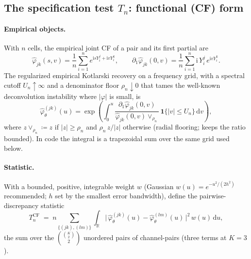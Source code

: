 \documentclass[11pt]{article}
\theoremstyle{definition}
\newcommand{\R}{\mathbb{R}}
\newcommand{\ecf}{\widehat{\varphi}}
\newcommand{\ii}{\mathrm{i}}          %
\newcommand{\Th}{\theta}
\newcommand{\lat}{\Th}
\begin{document}
\subsection{The specification test $T_n$: functional (CF) form}
\label{sec:testCF}

\paragraph{Empirical objects.} With $n$ cells, the empirical joint CF of a pair
and its first partial are
\[
  \ecf_{jk}(s,v)=\frac1n\sum_{i=1}^n e^{\ii s Y^j_i+\ii v Y^k_i},
  \qquad
  \partial_1\ecf_{jk}(0,v)=\frac1n\sum_{i=1}^n \ii\,Y^j_i\,e^{\ii v Y^k_i}.
\]
The regularized empirical Kotlarski recovery on a frequency grid, with a
spectral cutoff $U_n\uparrow\infty$ and a denominator floor $\rho_n\downarrow0$
that tames the well-known deconvolution instability where $|\varphi|$ is small,
is
\begin{equation}\label{eq:emp-kotlarski}
  \widehat{\varphi}_\lat^{(jk)}(u)
  =\exp\!\left(\int_0^{u}
  \frac{\partial_1\ecf_{jk}(0,v)}
       {\ecf_{jk}(0,v)\vee_{\rho_n}}\,
  \mathbf 1\{|v|\le U_n\}\,\mathrm dv\right),
\end{equation}
where $z\vee_{\rho_n}\coloneqq z$ if $|z|\ge\rho_n$ and
$\rho_n\,z/|z|$ otherwise (radial flooring; keeps the ratio bounded). In code
the integral is a trapezoidal sum over the same grid used below.

\paragraph{Statistic.} With a bounded, positive, integrable weight $w$
(Gaussian $w(u)=e^{-u^2/(2h^2)}$ recommended; $h$ set by the smallest error
bandwidth), define the pairwise-discrepancy statistic
\begin{equation}\label{eq:Tn-CF}
  T_n^{\mathrm{CF}}
  \;=\; n \!\!\sum_{\{(jk),(lm)\}}\!\!
  \int_{\R}\big|\,\widehat{\varphi}_\lat^{(jk)}(u)
                 -\widehat{\varphi}_\lat^{(lm)}(u)\,\big|^2\,w(u)\,\mathrm du,
\end{equation}
the sum over the $\binom{\binom K2}{2}$ unordered pairs of channel-pairs (three
terms at $K=3$).
\end{document}
